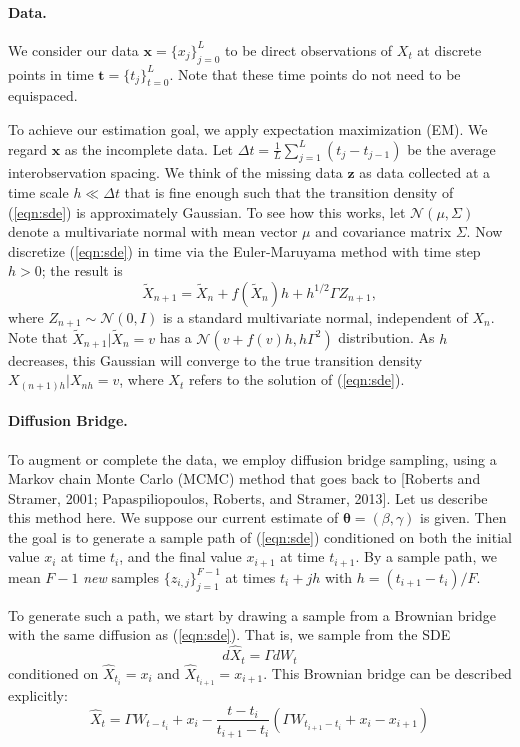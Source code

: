 \documentclass{article}
\newcommand{\btheta}{\ensuremath{\bm{\theta}}}
\begin{document}
\paragraph{Data.} We consider our data $\mathbf{x} = \{x_j\}_{j=0}^L$ to be direct observations of $X_t$ at discrete points in time $\mathbf{t} = \{t_j\}_{t=0}^L$.  Note that these time points do not need to be equispaced.  

To achieve our estimation goal, we apply expectation maximization (EM).  We regard $\mathbf{x}$ as the incomplete data.  Let $\Delta t = \frac{1}{L} \sum_{j=1}^{L} (t_j - t_{j-1})$ be the average interobservation spacing.  We think of the missing data $\mathbf{z}$ as data collected at a time scale $h \ll \Delta t$ that is fine enough such that the transition density of (\ref{eqn:sde}) is approximately Gaussian.  To see how this works, let $\mathcal{N}(\mu, \Sigma)$ denote a multivariate normal with mean vector $\mu$ and covariance matrix $\Sigma$.  Now discretize (\ref{eqn:sde}) in time via the Euler-Maruyama method with time step $h > 0$; the result is
\begin{equation} \label{eqn:euler}
\widetilde{X}_{n+1} = \widetilde{X}_n + f(\widetilde{X}_n) h + h^{1/2} \Gamma Z_{n+1},
\end{equation}
where $Z_{n+1} \sim \mathcal{N}(0, I)$ is a standard multivariate normal, independent of $X_n$.  Note that $\widetilde{X}_{n+1} | \widetilde{X}_n = v$ has a $\mathcal{N}(v + f(v) h, h \Gamma^2)$ distribution.  As $h$ decreases, this Gaussian will converge to the true transition density $X_{(n+1)h} | X_{nh} = v$, 
where $X_t$ refers to the solution of (\ref{eqn:sde}).

\paragraph{Diffusion Bridge.} To augment or complete the data, we employ diffusion bridge sampling, using a Markov chain Monte Carlo (MCMC) method that goes back to [Roberts and Stramer, 2001; Papaspiliopoulos, Roberts, and Stramer, 2013].  Let us describe this method here.  We suppose our current estimate of $\btheta = (\beta, \gamma)$ is given.  Then the goal is to generate a sample path of (\ref{eqn:sde}) conditioned on both the initial value $x_i$ at time $t_i$, and the final value $x_{i+1}$ at time $t_{i+1}$.  By a sample path, we mean $F-1$ \emph{new} samples $\{z_{i,j}\}_{j=1}^{F-1}$ at times $t_i + j h$ with $h = (t_{i+1} - t_i)/F$.

To generate such a path, we start by drawing a sample from a Brownian bridge with the same diffusion as (\ref{eqn:sde}).  That is, we sample from the SDE
\begin{equation}
\label{eqn:bbridgesde}
d\widehat{X}_t = \Gamma dW_t
\end{equation}
conditioned on $\widehat{X}_{t_i} = x_i$ and $\widehat{X}_{t_{i+1}} = x_{i+1}$.  This Brownian bridge can be described explicitly:
\begin{equation}
\label{eqn:bbridge}
\widehat{X}_t = \Gamma W_{t - t_i} + x_i - \frac{t - t_i}{t_{i+1} - t_i} (\Gamma W_{t_{i+1} - t_i} + x_{i} - x_{i+1} )
\end{equation}
\end{document}

